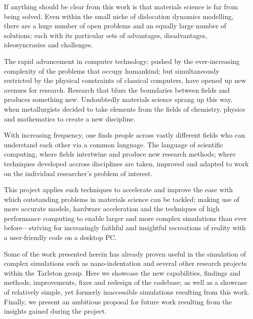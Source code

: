 
If anything should be clear from this work is that materials science is far from being solved. Even within the small niche of dislocation dynamics modelling, there are a huge number of open problems and an equally large number of solutions; each with its particular sets of advantages, disadvantages, ideosyncrasies and challenges.

The rapid advancement in computer technology; pushed by the ever-increasing complexity of the problems that occupy humankind; but simultaneously restricted by the physical constraints of classical computers, have opened up new avenues for research. Research that blurs the boundaries between fields and produces something new. Undoubtedly materials science sprang up this way, when metallurgists decided to take elements from the fields of chemistry, physics and mathematics to create a new discipline.

With increasing frequency, one finds people across vastly different fields who can understand each other via a common language. The language of scientific computing, where fields intertwine and produce new research methods; where techniques developed accross disciplines are taken, improved and adapted to work on the individual researcher's problem of interest.

This project applies such techniques to accelerate and improve the ease with which outstanding problems in materials science can be tackled; making use of more accurate models, hardware acceleration and the techniques of high performance computing to enable larger and more complex simulations than ever before---striving for increasingly faithful and insightful recreations of reality with a user-friendly code on a desktop PC.

Some of the work presented herein has already proven useful in the simulation of complex simulations such as nano-indentation \cite{YU2018} and several other research projects within the Tarleton group. Here we showcase the new capabilities, findings and methods; improvements, fixes and redesign of the codebase; as well as a showcase of relatively simple, yet formerly inaccessible simulations resulting from this work. Finally, we present an ambitious proposal for future work resulting from the insights gained during the project.
\savearabiccounter
